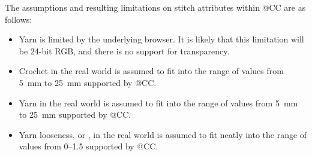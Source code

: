 \documentclass[main.tex]{subfiles}
\begin{document}
The assumptions and resulting limitations on stitch attributes within @CC are as follows:

\begin{itemize}
\item Yarn  is limited by the underlying browser. It is likely that this limitation will be 24-bit RGB, and there is no support for transparency.
\item Crochet  in the real world is assumed to fit into the range of values from \qty{5}{mm} to \qty{25}{mm} supported by @CC. 
\item Yarn  in the real world is assumed to fit into the range of values from \qty{5}{mm} to \qty{25}{mm} supported by @CC.
\item Yarn looseness, or , in the real world is assumed to fit neatly into the range of values from 0--1.5 supported by @CC.
\end{itemize}
\end{document}
